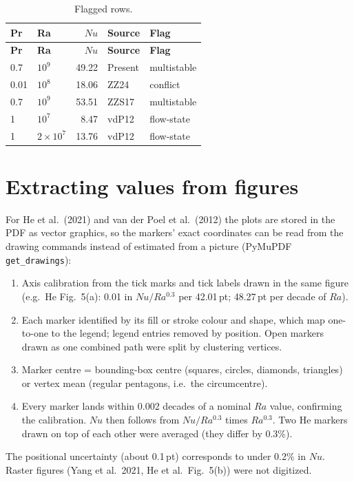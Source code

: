 \documentclass[11pt]{article}
\begin{document}
\begin{longtable}{l l r l l}
\caption{Flagged rows.}\label{tab:flags}\\
\toprule
\textbf{Pr} & \textbf{Ra} & $Nu$ & \textbf{Source} & \textbf{Flag} \\
\midrule
\endfirsthead
\toprule
\textbf{Pr} & \textbf{Ra} & $Nu$ & \textbf{Source} & \textbf{Flag} \\
\midrule
\endhead
\bottomrule
\endfoot
\rowcolor{excluded} 0.7 & $10^{9}$ & 49.22 & Present & multistable \\
\rowcolor{excluded} 0.01 & $10^{8}$ & 18.06 & ZZ24 & conflict \\
\rowcolor{excluded} 0.7 & $10^{9}$ & 53.51 & ZZS17 & multistable \\
\rowcolor{excluded} 1 & $10^{7}$ & 8.47 & vdP12 & flow-state \\
\rowcolor{excluded} 1 & $2\times10^{7}$ & 13.76 & vdP12 & flow-state \\
\end{longtable}

\section{Extracting values from figures}\label{sec:extraction}
For He et al.\ (2021) and van der Poel et al.\ (2012) the plots are stored
in the PDF as vector graphics, so the markers' exact coordinates can be read
from the drawing commands instead of estimated from a picture
(PyMuPDF \texttt{get\_drawings}):
\begin{enumerate}[leftmargin=1.6em, itemsep=0.3em]
\item Axis calibration from the tick marks and tick labels drawn in the
same figure (e.g.\ He Fig.~5(a): 0.01 in $Nu/Ra^{0.3}$ per 42.01\,pt;
48.27\,pt per decade of $Ra$).
\item Each marker identified by its fill or stroke colour and shape, which
map one-to-one to the legend; legend entries removed by position. Open
markers drawn as one combined path were split by clustering vertices.
\item Marker centre = bounding-box centre (squares, circles, diamonds,
triangles) or vertex mean (regular pentagons, i.e.\ the circumcentre).
\item Every marker lands within 0.002 decades of a nominal $Ra$ value,
confirming the calibration. $Nu$ then follows from $Nu/Ra^{0.3}$ times
$Ra^{0.3}$. Two He markers drawn on top of each other were averaged (they
differ by 0.3\%).
\end{enumerate}
The positional uncertainty (about 0.1\,pt) corresponds to under 0.2\% in
$Nu$. Raster figures (Yang et al.\ 2021, He et al.\ Fig.~5(b)) were not
digitized.
\end{document}

